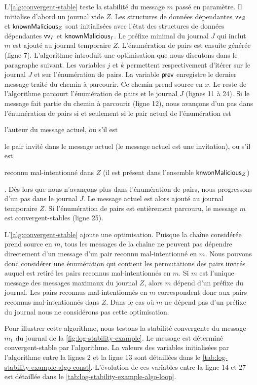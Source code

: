 L'\autoref{alg:convergent-stable} teste la stabilité du message $m$ passé en paramètre.
Il initialise d'abord un journal vide $Z$.
Les structures de données dépendantes $\operatorname{\mathsf{vv}}_Z$ et $\operatorname{\mathsf{knownMalicious}}_Z$ sont initialisées avec l'état des structures de données dépendantes $\operatorname{\mathsf{vv}}_I$ et $\operatorname{\mathsf{knownMalicious}}_I$.
Le préfixe minimal du journal $J$ qui inclut $m$ est ajouté au journal temporaire $Z$.
L'énumération de pairs est ensuite générée (ligne 7).
L'algorithme introduit une optimisation que nous discutons dans le paragraphe suivant.
Les variables $j$ et $k$ permettent respectivement d'itérer sur le journal $J$ et sur l'énumération de pairs.
La variable $\operatorname{\mathsf{prev}}$ enregistre le dernier message traité du chemin à parcourir.
Ce chemin prend source en $x$.
Le reste de l'algorithme parcourt l'énumération de pairs et le journal $J$ (lignes 11 à 24).
Si le message fait partie du chemin à parcourir (ligne 12), nous avançons d'un pas dans l'énumération de pairs si et seulement si le pair actuel de l'énumération est \begin{inlinelist}\item l'auteur du message actuel, ou s'il est \item le pair invité dans le message actuel (le message actuel est une invitation), ou s'il est \item reconnu mal-intentionné dans $Z$ (il est présent dans l'ensemble $\operatorname{\mathsf{knwonMalicious}}_Z$) \end{inlinelist}.
Dès lors que nous n'avançons plus dans l'énumération de pairs, nous progressons d'un pas dans le journal $J$.
Le message actuel est alors ajouté au journal temporaire $Z$.
Si l'énumération de pairs est entièrement parcouru, le message $m$ est convergent-stables (ligne 25).

L'\autoref{alg:convergent-stable} ajoute une optimisation.
Puisque la chaîne considérée prend source en $m$, tous les messages de la chaîne ne peuvent pas dépendre directement d'un message d'un pair reconnu mal-intentionné en $m$.
Nous pouvons donc considérer une énumération qui contient les permutations des pairs invités auquel est retiré les pairs reconnus mal-intentionnés en $m$.
Si $m$ est l'unique message des messages maximaux du journal $Z$, alors $m$ dépend d'un préfixe du journal.
Les pairs reconnus mal-intentionnés en $m$ correspondent donc aux pairs reconnus mal-intentionnés dans $Z$.
Dans le cas où $m$ ne dépend pas d'un préfixe du journal nous ne considérons pas cette optimisation.

Pour illustrer cette algorithme, nous testons la stabilité convergente du message $m_1$ du journal de la \autoref{fig:log-stability-example}.
Le message est déterminé convergent-stable par l'algorithme.
La valeurs des variables initialisées par l'algorithme entre la lignes 2 et la ligne 13 sont détaillées dans le \autoref{tab:log-stability-example-algo-const}.
L'évolution de ces variables entre la ligne 14 et 27 est détaillée dans le \autoref{tab:log-stability-example-algo-loop}.

